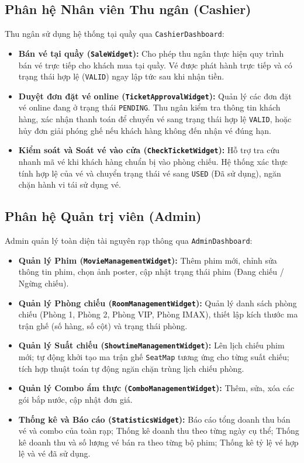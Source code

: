 \documentclass[12pt,a4paper]{article}
\begin{document}
\subsection{Phân hệ Nhân viên Thu ngân (Cashier)}
Thu ngân sử dụng hệ thống tại quầy qua \texttt{CashierDashboard}:
\begin{itemize}
    \item \textbf{Bán vé tại quầy (\texttt{SaleWidget}):} Cho phép thu ngân thực hiện quy trình bán vé trực tiếp cho khách mua tại quầy. Vé được phát hành trực tiếp và có trạng thái hợp lệ (\texttt{VALID}) ngay lập tức sau khi nhận tiền.
    \item \textbf{Duyệt đơn đặt vé online (\texttt{TicketApprovalWidget}):} Quản lý các đơn đặt vé online đang ở trạng thái \texttt{PENDING}. Thu ngân kiểm tra thông tin khách hàng, xác nhận thanh toán để chuyển vé sang trạng thái hợp lệ \texttt{VALID}, hoặc hủy đơn giải phóng ghế nếu khách hàng không đến nhận vé đúng hạn.
    \item \textbf{Kiểm soát và Soát vé vào cửa (\texttt{CheckTicketWidget}):} Hỗ trợ tra cứu nhanh mã vé khi khách hàng chuẩn bị vào phòng chiếu. Hệ thống xác thực tính hợp lệ của vé và chuyển trạng thái vé sang \texttt{USED} (Đã sử dụng), ngăn chặn hành vi tái sử dụng vé.
\end{itemize}

\subsection{Phân hệ Quản trị viên (Admin)}
Admin quản lý toàn diện tài nguyên rạp thông qua \texttt{AdminDashboard}:
\begin{itemize}
    \item \textbf{Quản lý Phim (\texttt{MovieManagementWidget}):} Thêm phim mới, chỉnh sửa thông tin phim, chọn ảnh poster, cập nhật trạng thái phim (Đang chiếu / Ngừng chiếu).
    \item \textbf{Quản lý Phòng chiếu (\texttt{RoomManagementWidget}):} Quản lý danh sách phòng chiếu (Phòng 1, Phòng 2, Phòng VIP, Phòng IMAX), thiết lập kích thước ma trận ghế (số hàng, số cột) và trạng thái phòng.
    \item \textbf{Quản lý Suất chiếu (\texttt{ShowtimeManagementWidget}):} Lên lịch chiếu phim mới; tự động khởi tạo ma trận ghế \texttt{SeatMap} tương ứng cho từng suất chiếu; tích hợp thuật toán tự động ngăn chặn trùng lịch chiếu phòng.
    \item \textbf{Quản lý Combo ẩm thực (\texttt{ComboManagementWidget}):} Thêm, sửa, xóa các gói bắp nước, cập nhật đơn giá.
    \item \textbf{Thống kê và Báo cáo (\texttt{StatisticsWidget}):} Báo cáo tổng doanh thu bán vé và combo của toàn rạp; Thống kê doanh thu theo từng ngày cụ thể; Thống kê doanh thu và số lượng vé bán ra theo từng bộ phim; Thống kê tỷ lệ vé hợp lệ và vé đã sử dụng.
\end{itemize}
\end{document}
